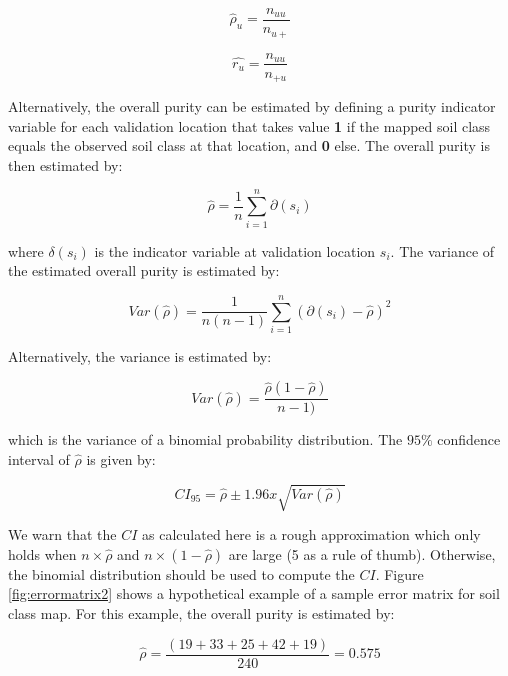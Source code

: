 \documentclass[10pt,b5paper,]{book}
\theoremstyle{definition}
\theoremstyle{definition}
\theoremstyle{definition}
\theoremstyle{remark}
\begin{document}
\begin{equation}
\hat{\rho}_u = \frac{ n_{uu}}{n_{u+}}
\end{equation}

\begin{equation}
\hat{r_u} = \frac{ n_{uu}}{n_{+u}}
\end{equation}

Alternatively, the overall purity can be estimated by defining a purity
indicator variable for each validation location that takes value
\textbf{1} if the mapped soil class equals the observed soil class at
that location, and \textbf{0} else. The overall purity is then estimated
by:

\begin{equation}
\hat{\rho} = \frac{1}{n} \sum_{i=1}^{n} \partial(s_i)
\end{equation}

where \({\delta(s_i)}\) is the indicator variable at validation location
\(s_i\). The variance of the estimated overall purity is estimated by:

\begin{equation}
Var(\hat{\rho}) = \frac{1}{n(n-1)} \sum_{i=1}^{n} (\partial(s_i) - \hat{\rho})^2
\end{equation}

Alternatively, the variance is estimated by:

\begin{equation}
Var(\hat{\rho}) = \frac{\hat{\rho}(1 - \hat{\rho})}{n - 1)}
\end{equation}

which is the variance of a binomial probability distribution. The
\(95\%\) confidence interval of \(\hat{\rho}\) is given by:

\begin{equation}
CI_{95} = \hat{\rho} \pm 1.96x \sqrt{Var(\hat{\rho})}
\end{equation}

We warn that the \(CI\) as calculated here is a rough approximation
which only holds when \(n \times \hat{\rho}\) and
\(n \times (1 - \hat{\rho})\) are large (5 as a rule of thumb).
Otherwise, the binomial distribution should be used to compute the
\(CI\). Figure \ref{fig:errormatrix2} shows a hypothetical example of a
sample error matrix for soil class map. For this example, the overall
purity is estimated by:

\begin{equation}
\hat{\rho} = \frac{(19 + 33 + 25 + 42 + 19)}{240} = 0.575
\end{equation}
\end{document}
